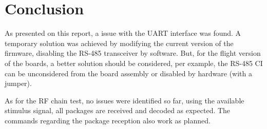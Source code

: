 \section{Conclusion}

As presented on this report, a issue with the UART interface was found. A temporary solution was achieved by modifying the current version of the firmware, disabling the RS-485 transceiver by software. But, for the flight version of the boards, a better solution should be considered, per example, the RS-485 CI can be unconsidered from the board assembly or disabled by hardware (with a jumper).

As for the RF chain test, no issues were identified so far, using the available stimulus signal, all packages are received and decoded as expected. The commands regarding the package reception also work as planned.
